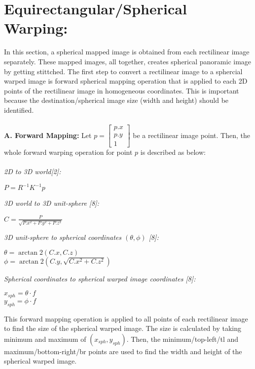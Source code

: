 \documentclass{article}
\begin{document}
\section*{Equirectangular/Spherical Warping:}
In this section, a spherical mapped image is obtained from each rectilinear image separately. These mapped images, all together, creates spherical panoramic image by getting stittched. The first step to convert a rectilinear image to a sphercial warped image is forward spherical mapping operation that is applied to each 2D points of the rectilinear image in homogeneous coordinates. This is important because the destination/spherical image size (width and height) should be identified.\\~\\
\textbf{A. Forward Mapping:}
 Let \begin{math}
    p = \begin{bmatrix}
		 	p.x\\
		    p.y\\
             1
		\end{bmatrix}
\end{math} be a rectilinear image point. Then, the whole forward warping operation for point $p$ is described as below:\\~\\
\textit{2D to 3D world[2]:}
\begin{center}
	 $P = R^{-1}  K^{-1} p$ 
\end{center}
\textit{3D world to 3D unit-sphere [8]:}
\begin{center}
	 $C = \frac{P}{\sqrt{P.x^{2} + P.y^{2} + P.z^{2}}}$
\end{center}
\textit{3D unit-sphere to spherical coordinates $(\theta, \phi)$ [8]:}
\begin{center}
	 $\theta = \arctan2( C.x, C.z)$\\ 
	 $\phi = \arctan2(C.y, \sqrt{C.x^{2} + C.z^{2}})$
\end{center}
\textit{Spherical coordinates to spherical warped image coordinates [8]:}
\begin{center}
 	 $x_{sph} = \theta \cdot f$ \\
	 $y_{sph} = \phi \cdot f$  
\end{center}
This forward mapping operation is applied to all points of each rectilinear image to find the size of the spherical warped image. The size is calculated by taking minimum and maximum of $(x_{sph}, y_{sph})$. Then, the minimum/top-left/tl and maximum/bottom-right/br points are used to find the width and height of the spherical warped image.
\end{document}
